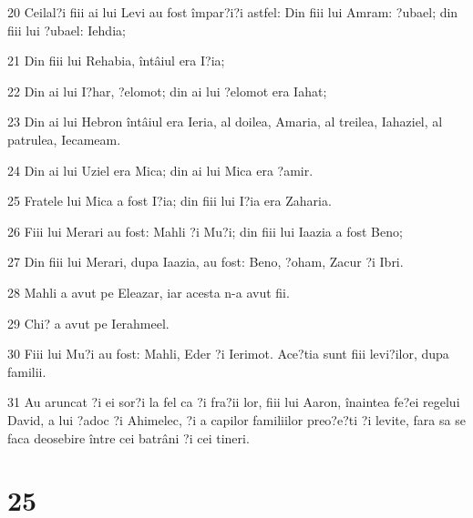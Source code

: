 \par 20 Ceilal?i fiii ai lui Levi au fost împar?i?i astfel: Din fiii lui Amram: ?ubael; din fiii lui ?ubael: Iehdia;
\par 21 Din fiii lui Rehabia, întâiul era I?ia;
\par 22 Din ai lui I?har, ?elomot; din ai lui ?elomot era Iahat;
\par 23 Din ai lui Hebron întâiul era Ieria, al doilea, Amaria, al treilea, Iahaziel, al patrulea, Iecameam.
\par 24 Din ai lui Uziel era Mica; din ai lui Mica era ?amir.
\par 25 Fratele lui Mica a fost I?ia; din fiii lui I?ia era Zaharia.
\par 26 Fiii lui Merari au fost: Mahli ?i Mu?i; din fiii lui Iaazia a fost Beno;
\par 27 Din fiii lui Merari, dupa Iaazia, au fost: Beno, ?oham, Zacur ?i Ibri.
\par 28 Mahli a avut pe Eleazar, iar acesta n-a avut fii.
\par 29 Chi? a avut pe Ierahmeel.
\par 30 Fiii lui Mu?i au fost: Mahli, Eder ?i Ierimot. Ace?tia sunt fiii levi?ilor, dupa familii.
\par 31 Au aruncat ?i ei sor?i la fel ca ?i fra?ii lor, fiii lui Aaron, înaintea fe?ei regelui David, a lui ?adoc ?i Ahimelec, ?i a capilor familiilor preo?e?ti ?i levite, fara sa se faca deosebire între cei batrâni ?i cei tineri.

\chapter{25}

